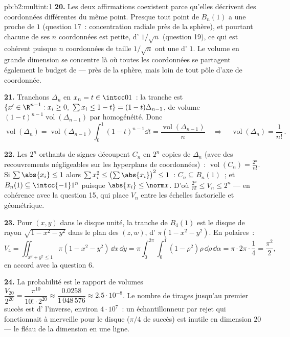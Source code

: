\begin{solution}{pb:b2:multint:1}
\textbf{20.} Les deux affirmations coexistent parce qu'elles décrivent
des coordonnées différentes du même point. Presque tout point
de $B_n(1)$ a une  proche de $1$ (question 17~: concentration
radiale près de la sphère), et pourtant chacune de ses $n$
coordonnées est petite, d' $1/\sqrt n$ (question 19),
ce qui est cohérent puisque $n$ coordonnées de taille $1/\sqrt n$
ont une  d' $1$. Le volume en grande dimension se concentre
là où toutes les coordonnées se partagent également le budget de 
--- près de la sphère, mais loin de tout pôle d'axe de coordonnée.

\textbf{21.} Tranchons $\Delta_n$ en $x_n = t \in \intcc01$~: la
tranche est $\{x' \in \R^{n-1} : x_i \geq 0,\ \sum x_i \leq 1 -
t\} = (1-t)\Delta_{n-1}$, de volume
$(1-t)^{n-1}\operatorname{vol}(\Delta_{n-1})$ par homogénéité.
Donc
\[
\operatorname{vol}(\Delta_n) =
\operatorname{vol}(\Delta_{n-1})\int_0^1(1 - t)^{n-1}\dd t =
\frac{\operatorname{vol}(\Delta_{n-1})}{n}
\quad\Longrightarrow\quad
\operatorname{vol}(\Delta_n) = \frac1{n!}\,.
\]

\textbf{22.} Les $2^n$ orthants de signes découpent $C_n$ en $2^n$
copies de $\Delta_n$ (avec des recouvrements négligeables sur les
hyperplans de coordonnées)~: $\operatorname{vol}(C_n) = \frac{2^n}{n!}$. Si
$\sum\abs{x_i} \leq 1$ alors $\sum x_i^2 \leq
\bigl(\sum\abs{x_i}\bigr)^2 \leq 1$~: $C_n \subseteq B_n(1)$~;
et $B_n(1) \subseteq \intcc{-1}1^n$ puisque $\abs{x_i} \leq
\norm x$. D'où $\frac{2^n}{n!} \leq V_n \leq 2^n$ ---
en cohérence avec la question 15, qui place $V_n$ entre les échelles
factorielle et géométrique.

\textbf{23.} Pour $(x, y)$ dans le disque unité, la tranche de
$B_4(1)$ est le disque de rayon $\sqrt{1 - x^2 - y^2}$ dans le
plan des $(z, w)$, d' $\pi(1 - x^2 - y^2)$. En polaires~:
\[
V_4 = \iint_{x^2+y^2\leq1}\pi(1 - x^2 - y^2)\,\dd x\,\dd y
= \pi\int_0^{2\pi}\!\!\int_0^1(1 - \rho^2)\rho\,
\dd\rho\,\dd\alpha
= \pi\cdot2\pi\cdot\frac14 = \frac{\pi^2}2 ,
\]
en accord avec la question 6.

\textbf{24.} La probabilité est le rapport de volumes
$\dfrac{V_{20}}{2^{20}} = \dfrac{\pi^{10}}{10!\cdot2^{20}}
\approx \dfrac{0.0258}{1\,048\,576} \approx
2.5\cdot10^{-8}$. Le nombre de tirages jusqu'au premier succès est
d' l'inverse, environ $4\cdot10^7$~: un échantillonneur par rejet
qui fonctionnait à merveille pour le disque ($\pi/4$ de succès) est
inutile en dimension $20$ --- le fléau de la dimension en
une ligne.


\end{solution}
